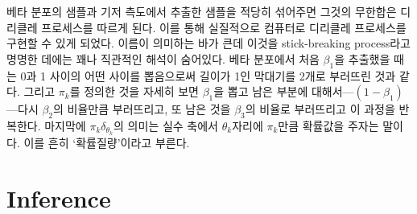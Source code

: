 \documentclass[a4paper, 10pt]{book}
\begin{document}
  베타 분포의 샘플과 기저 측도에서 추출한 샘플을 적당히 섞어주면 그것의 무한합은 디리클레 프로세스를 따르게 된다. 이를 통해 실질적으로 컴퓨터로 디리클레 프로세스를 구현할 수 있게 되었다. 이름이 의미하는 바가 큰데 이것을 stick-breaking process라고 명명한 데에는 꽤나 직관적인 해석이 숨어있다. 베타 분포에서 처음 $\beta_{1}$을 추출했을 때는 0과 1 사이의 어떤 사이를 뽑음으로써 길이가 1인 막대기를 2개로 부러뜨린 것과 같다. 그리고 $\pi_{k}$를 정의한 것을 자세히 보면 $\beta_{1}$을 뽑고 남은 부분에 대해서---$\left(1-\beta_{1}\right)$---다시 $\beta_{2}$의 비율만큼 부러뜨리고, 또 남은 것을 $\beta_{3}$의 비율로 부러뜨리고 이 과정을 반복한다. 마지막에 $\pi_{k}\delta_{\theta_{k}}$의 의미는 실수 축에서 $\theta_{k}$자리에 $\pi_{k}$만큼 확률값을 주자는 말이다. 이를 흔히 `확률질량'이라고 부른다.
\chapter{Inference}
\end{document}
